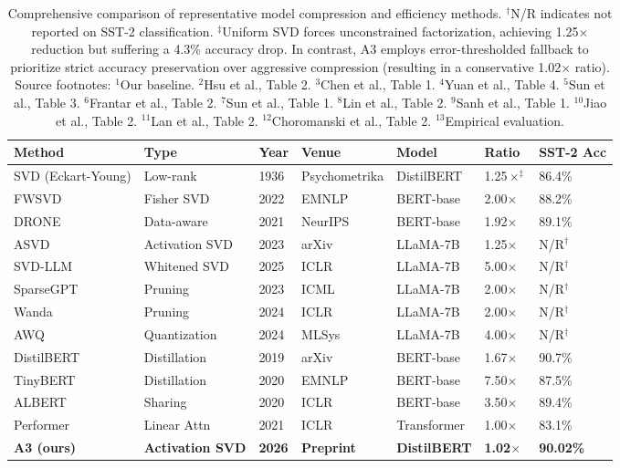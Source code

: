 \begin{table}[t]
\centering
\small
\begin{tabular}{lllllll}
\toprule
\textbf{Method} & \textbf{Type} & \textbf{Year} & \textbf{Venue} & \textbf{Model} & \textbf{Ratio} & \textbf{SST-2 Acc} \\
\midrule
SVD (Eckart-Young)\footnotemark[1] & Low-rank & 1936 & Psychometrika & DistilBERT & 1.25$\times^\ddagger$ & 86.4\% \\
FWSVD\footnotemark[2] & Fisher SVD & 2022 & EMNLP & BERT-base & 2.00$\times$ & 88.2\% \\
DRONE\footnotemark[3] & Data-aware & 2021 & NeurIPS & BERT-base & 1.92$\times$ & 89.1\% \\
ASVD\footnotemark[4] & Activation SVD & 2023 & arXiv & LLaMA-7B & 1.25$\times$ & N/R$^\dagger$ \\
SVD-LLM\footnotemark[5] & Whitened SVD & 2025 & ICLR & LLaMA-7B & 5.00$\times$ & N/R$^\dagger$ \\
SparseGPT\footnotemark[6] & Pruning & 2023 & ICML & LLaMA-7B & 2.00$\times$ & N/R$^\dagger$ \\
Wanda\footnotemark[7] & Pruning & 2024 & ICLR & LLaMA-7B & 2.00$\times$ & N/R$^\dagger$ \\
AWQ\footnotemark[8] & Quantization & 2024 & MLSys & LLaMA-7B & 4.00$\times$ & N/R$^\dagger$ \\
DistilBERT\footnotemark[9] & Distillation & 2019 & arXiv & BERT-base & 1.67$\times$ & 90.7\% \\
TinyBERT\footnotemark[10] & Distillation & 2020 & EMNLP & BERT-base & 7.50$\times$ & 87.5\% \\
ALBERT\footnotemark[11] & Sharing & 2020 & ICLR & BERT-base & 3.50$\times$ & 89.4\% \\
Performer\footnotemark[12] & Linear Attn & 2021 & ICLR & Transformer & 1.00$\times$ & 83.1\% \\
\textbf{A3 (ours)}\footnotemark[13] & \textbf{Activation SVD} & \textbf{2026} & \textbf{Preprint} & \textbf{DistilBERT} & \textbf{1.02$\times$} & \textbf{90.02\%} \\
\bottomrule
\end{tabular}
\caption{Comprehensive comparison of representative model compression and efficiency methods. $^\dagger$N/R indicates not reported on SST-2 classification. $^\ddagger$Uniform SVD forces unconstrained factorization, achieving 1.25$\times$ reduction but suffering a 4.3\% accuracy drop. In contrast, A3 employs error-thresholded fallback to prioritize strict accuracy preservation over aggressive compression (resulting in a conservative 1.02$\times$ ratio). Source footnotes: $^1$Our baseline. $^2$Hsu et al., Table 2. $^3$Chen et al., Table 1. $^4$Yuan et al., Table 4. $^5$Sun et al., Table 3. $^6$Frantar et al., Table 2. $^7$Sun et al., Table 1. $^8$Lin et al., Table 2. $^9$Sanh et al., Table 1. $^{10}$Jiao et al., Table 2. $^{11}$Lan et al., Table 2. $^{12}$Choromanski et al., Table 2. $^{13}$Empirical evaluation.}
\label{tab:prior_work_comparison}
\end{table}

